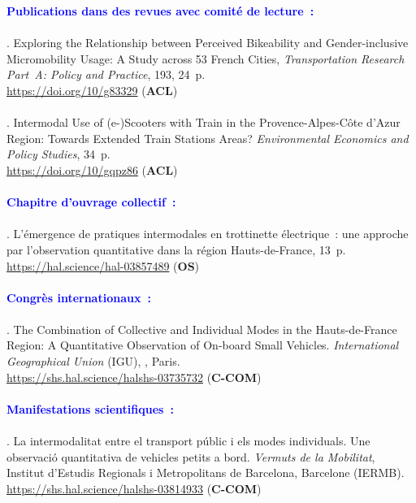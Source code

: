 \begin{refsegment}
    \begin{tcolorbox}[colback=white!5!white,
                      colframe=blue!75!blue,
                      title=Valorisation scientifique
                      \\
                      Chapitre~4]
\Large{\textcolor{blue}{\textbf{Publications dans des revues avec comité de lecture~:}}}
    \\\\
\small{\textcolor{blue}{\textcite{moinse_exploring_2025}}. Exploring the Relationship between Perceived Bikeability and Gender-inclusive Micromobility Usage: A Study across 53 French Cities, \textsl{Transportation Research Part~A: Policy and Practice}, 193, 24~p.
\\
\footnotesize{\url{https://doi.org/10/g83329}} (\textbf{ACL})}
    \\\\
\small{\textcolor{blue}{\textcite{moinse_intermodal_2022}}. Intermodal Use of (e-)Scooters with Train in the Provence-Alpes-Côte d’Azur Region: Towards Extended Train Stations Areas? \textsl{Environmental Economics and Policy Studies}, 34~p. 
\\
\footnotesize{\url{https://doi.org/10/gqpz86}} (\textbf{ACL})}
    \\\\
\Large{\textcolor{blue}{\textbf{Chapitre d'ouvrage collectif~:}}}
    \\\\
\small{\textcolor{blue}{\textcite{moinse_lemergence_2022}}. L'émergence de pratiques intermodales en trottinette électrique~: une approche par l'observation quantitative dans la région Hauts-de-France, 13~p.
\\
\footnotesize{\url{https://hal.science/hal-03857489}} (\textbf{OS})}
    \\\\
\Large{\textcolor{blue}{\textbf{Congrès internationaux~:}}}
    \\\\
\small{\textcolor{blue}{\textcite{moinse_combination_2022}}. The Combination of Collective and Individual Modes in the Hauts-de-France Region: A Quantitative Observation of On-board Small Vehicles. \textsl{International Geographical Union} (IGU), , Paris. 
\\
\footnotesize{\url{https://shs.hal.science/halshs-03735732}} (\textbf{C-COM})}
    \\\\
\Large{\textcolor{blue}{\textbf{Manifestations scientifiques~:}}}
    \\\\
\small{\textcolor{blue}{\textcite{moinse_intermodalitat_2022}}. La intermodalitat entre el transport públic i els modes individuals. Une observació quantitativa de vehicles petits a bord. \textsl{Vermuts de la Mobilitat}, Institut d'Estudis Regionals i Metropolitans de Barcelona, Barcelone (IERMB).
\\
\footnotesize{\url{https://shs.hal.science/halshs-03814933}} (\textbf{C-COM})}
    \end{tcolorbox}


\end{refsegment}
